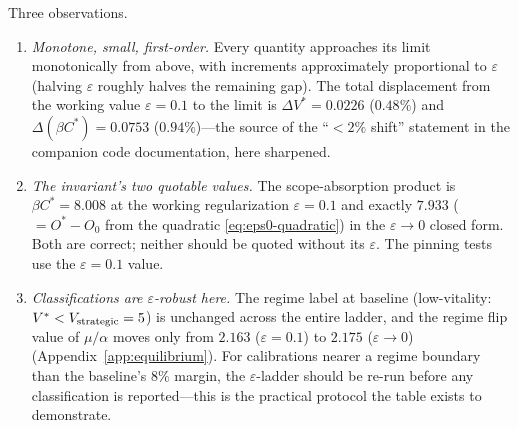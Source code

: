 Three observations.

\begin{enumerate}
\item \emph{Monotone, small, first-order.} Every quantity approaches its
limit monotonically from above, with increments approximately proportional
to $\varepsilon$ (halving $\varepsilon$ roughly halves the remaining gap).
The total displacement from the working value $\varepsilon=0.1$ to the
limit is $\Delta V^{*}=0.0226$ ($0.48\%$) and
$\Delta(\beta C^{*})=0.0753$ ($0.94\%$)---the source of the ``$<2\%$
shift'' statement in the companion code documentation, here sharpened.
\item \emph{The invariant's two quotable values.} The scope-absorption
product is $\beta C^{*}=8.008$ at the working regularization
$\varepsilon=0.1$ and exactly $7.933$ ($=O^{*}-O_0$ from the quadratic
\eqref{eq:eps0-quadratic}) in the $\varepsilon\to0$ closed form. Both are
correct; neither should be quoted without its $\varepsilon$. The pinning
tests use the $\varepsilon=0.1$ value.
\item \emph{Classifications are $\varepsilon$-robust here.} The regime
label at baseline (low-vitality: $V^{*}<V_{\mathrm{strategic}}=5$) is unchanged across
the entire ladder, and the regime flip value of $\mu/\alpha$ moves only
from $2.163$ ($\varepsilon=0.1$) to $2.175$ ($\varepsilon\to0$)
(Appendix~\ref{app:equilibrium}). For calibrations nearer a regime
boundary than the baseline's $8\%$ margin, the $\varepsilon$-ladder should
be re-run before any classification is reported---this is the practical
protocol the table exists to demonstrate.
\end{enumerate}
